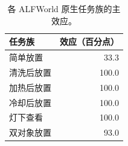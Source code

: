 \begin{table}[t]
\centering
\caption{各 ALFWorld 原生任务族的主效应。}
\label{tab:family}
\begin{tabular}{lr}
\toprule
任务族 & 效应（百分点） \\
\midrule
简单放置 & 33.3 \\
清洗后放置 & 100.0 \\
加热后放置 & 100.0 \\
冷却后放置 & 100.0 \\
灯下查看 & 100.0 \\
双对象放置 & 93.0 \\
\bottomrule
\end{tabular}
\end{table}
